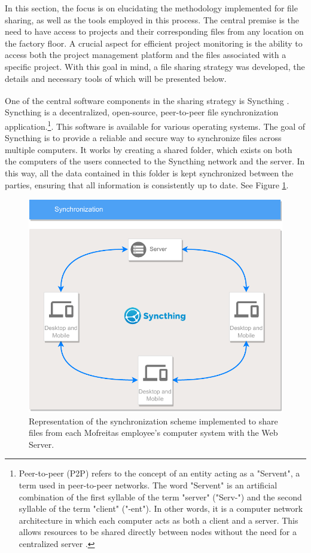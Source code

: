 In this section, the focus is on elucidating the methodology implemented for file sharing, as well as the tools employed in this process. The central premise is the need to have access to projects and their corresponding files from any location on the factory floor. A crucial aspect for efficient project monitoring is the ability to access both the project management platform and the files associated with a specific project. With this goal in mind, a file sharing strategy was developed, the details and necessary tools of which will be presented below.

One of the central software components in the sharing strategy is Syncthing\textsuperscript{\textregistered} \cite{jakob_borg_syncthing_nodate}. Syncthing is a decentralized, open-source, peer-to-peer file synchronization application.\footnote{Peer-to-peer (P2P) refers to the concept of an entity acting as a "Servent", a term used in peer-to-peer networks. The word "Servent" is an artificial combination of the first syllable of the term "server" ("Serv-") and the second syllable of the term "client" ("-ent"). In other words, it is a computer network architecture in which each computer acts as both a client and a server. This allows resources to be shared directly between nodes without the need for a centralized server \cite{Schollmeier2001}.}. This software is available for various operating systems. The goal of Syncthing is to provide a reliable and secure way to synchronize files across multiple computers. It works by creating a shared folder, which exists on both the computers of the users connected to the Syncthing network and the server. In this way, all the data contained in this folder is kept synchronized between the parties, ensuring that all information is consistently up to date. See Figure \ref{fig:syncFiles}.

\begin{figure}[!ht]
    \centering
    \includegraphics[width=.65\linewidth]{images/Development/chap3/Syncronization.pdf}
    \caption{Representation of the synchronization scheme implemented to share files from each Mofreitas employee's computer system with the Web Server.}
    \label{fig:syncFiles}
\end{figure}

